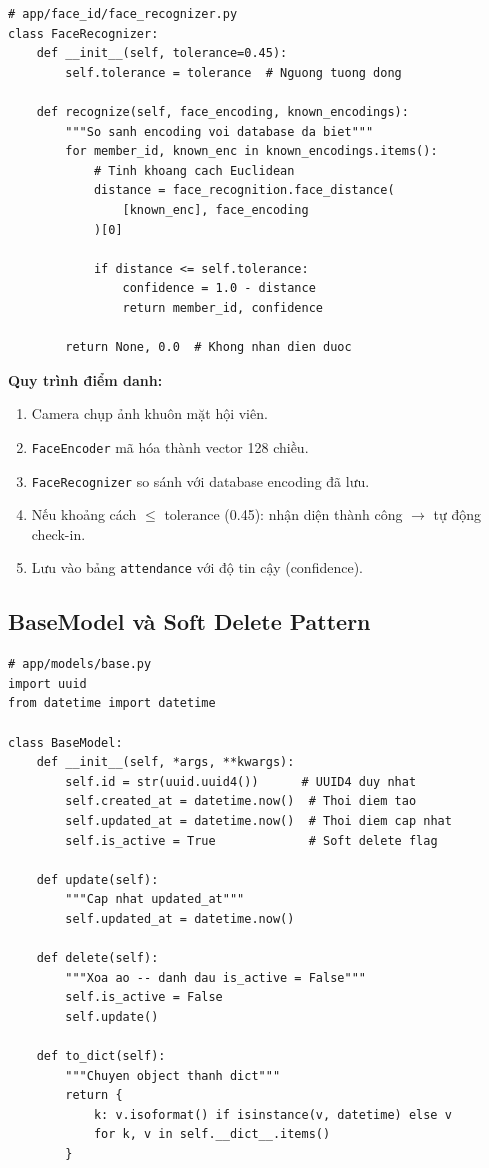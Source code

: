 \documentclass[12pt,a4paper]{article}
\begin{document}
\begin{lstlisting}[style=pythonstyle, caption={Nhận diện khuôn mặt khi điểm danh}]
# app/face_id/face_recognizer.py
class FaceRecognizer:
    def __init__(self, tolerance=0.45):
        self.tolerance = tolerance  # Nguong tuong dong

    def recognize(self, face_encoding, known_encodings):
        """So sanh encoding voi database da biet"""
        for member_id, known_enc in known_encodings.items():
            # Tinh khoang cach Euclidean
            distance = face_recognition.face_distance(
                [known_enc], face_encoding
            )[0]

            if distance <= self.tolerance:
                confidence = 1.0 - distance
                return member_id, confidence

        return None, 0.0  # Khong nhan dien duoc
\end{lstlisting}

\textbf{Quy trình điểm danh:}
\begin{enumerate}[leftmargin=2cm]
	\item Camera chụp ảnh khuôn mặt hội viên.
	\item \texttt{FaceEncoder} mã hóa thành vector 128 chiều.
	\item \texttt{FaceRecognizer} so sánh với database encoding đã lưu.
	\item Nếu khoảng cách $\leq$ tolerance (0.45): nhận diện thành công $\rightarrow$ tự động check-in.
	\item Lưu vào bảng \texttt{attendance} với độ tin cậy (confidence).
\end{enumerate}

\subsection{BaseModel và Soft Delete Pattern}

\begin{lstlisting}[style=pythonstyle, caption={BaseModel -- lớp nền cho mọi model}]
# app/models/base.py
import uuid
from datetime import datetime

class BaseModel:
    def __init__(self, *args, **kwargs):
        self.id = str(uuid.uuid4())      # UUID4 duy nhat
        self.created_at = datetime.now()  # Thoi diem tao
        self.updated_at = datetime.now()  # Thoi diem cap nhat
        self.is_active = True             # Soft delete flag

    def update(self):
        """Cap nhat updated_at"""
        self.updated_at = datetime.now()

    def delete(self):
        """Xoa ao -- danh dau is_active = False"""
        self.is_active = False
        self.update()

    def to_dict(self):
        """Chuyen object thanh dict"""
        return {
            k: v.isoformat() if isinstance(v, datetime) else v
            for k, v in self.__dict__.items()
        }
\end{lstlisting}
\end{document}
